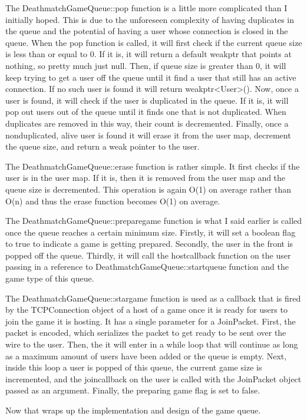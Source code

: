 \documentclass[conference]{IEEEtran}
\begin{document}
The DeathmatchGameQueue::pop function is a little more complicated than I initially hoped.
This is due to the unforeseen complexity of having duplicates in the queue and the potential of having a user whose connection is closed in the queue.
When the pop function is called, it will first check if the current queue size is less than or equal to 0.
If it is, it will return a default weak\textunderscore ptr that points at nothing, so pretty much just null.
Then, if queue size is greater than 0, it will keep trying to get a user off the queue until it find a user that still has an active connection.
If no such user is found it will return weak\textunderscore ptr<User>().
Now, once a user is found, it will check if the user is duplicated in the queue.
If it is, it will pop out users out of the queue until it finds one that is not duplicated.
When duplicates are removed in this way, their count is decremented.
Finally, once a nonduplicated, alive user is found it will erase it from the user map, decrement the queue size, and return a weak pointer to the user. \par
The DeathmatchGameQueue::erase function is rather simple.
It first checks if the user is in the user map.
If it is, then it is removed from the user map and the queue size is decremented.
This operation is again O(1) on average rather than O(n) and thus the erase function becomes O(1) on average. \par
The DeathmatchGameQueue::prepare\textunderscore game function is what I said earlier is called once the queue reaches a certain minimum size.
Firstly, it will set a boolean flag to true to indicate a game is getting prepared.
Secondly, the user in the front is popped off the queue.
Thirdly, it will call the host\textunderscore callback function on the user passing in a reference to DeathmatchGameQueue::start\textunderscore queue function and the game type of this queue. \par
The DeathmatchGameQueue::star\textunderscore game function is used as a callback that is fired by the TCPConnection object of a host of a game once it is ready for users to join the game it is hosting.
It has a single parameter for a JoinPacket.
First, the packet is encoded, which serializes the packet to get ready to be sent over the wire to the user.
Then, the it will enter in a while loop that will continue as long as a maximum amount of users have been added or the queue is empty.
Next, inside this loop a user is popped of this queue, the current game size is incremented, and the join\textunderscore callback on the user is called with the JoinPacket object passed as an argument.
Finally, the preparing game flag is set to false. \par
Now that wraps up the implementation and design of the game queue.
\end{document}

